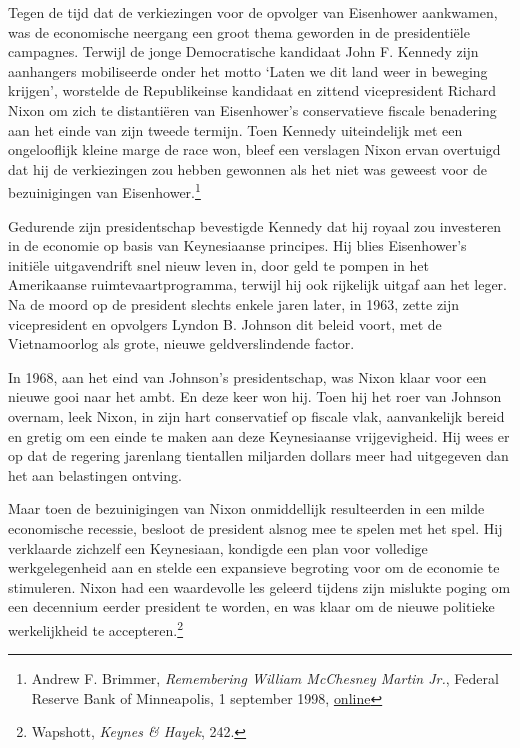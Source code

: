 \documentclass[
  a5paper,
  smalldemyvopaper,11pt,twoside,onecolumn,openright,extrafontsizes,
hidelinks]{memoir}
\begin{document}
Tegen de tijd dat de verkiezingen voor de opvolger van Eisenhower
aankwamen, was de economische neergang een groot thema geworden in de
presidentiële campagnes. Terwijl de jonge Democratische kandidaat John
F. Kennedy zijn aanhangers mobiliseerde onder het motto `Laten we dit
land weer in beweging krijgen', worstelde de Republikeinse kandidaat en
zittend vicepresident Richard Nixon om zich te distantiëren van
Eisenhower's conservatieve fiscale benadering aan het einde van zijn
tweede termijn. Toen Kennedy uiteindelijk met een ongelooflijk kleine
marge de race won, bleef een verslagen Nixon ervan overtuigd dat hij de
verkiezingen zou hebben gewonnen als het niet was geweest voor de
bezuinigingen van Eisenhower.\footnote{\hspace{0pt}Andrew F. Brimmer,
  \emph{Remembering William McChesney Martin Jr.}, Federal Reserve Bank
  of Minneapolis, 1 september 1998,
  \href{https://www.minneapolisfed.org/article/1998/remembering-william-mcchesney-martin-jr.}{online}}

Gedurende zijn presidentschap bevestigde Kennedy dat hij royaal zou
investeren in de economie op basis van Keynesiaanse principes. Hij blies
Eisenhower's initiële uitgavendrift snel nieuw leven in, door geld te
pompen in het Amerikaanse ruimtevaartprogramma, terwijl hij ook
rijkelijk uitgaf aan het leger. Na de moord op de president slechts
enkele jaren later, in 1963, zette zijn vicepresident en opvolgers
Lyndon B. Johnson dit beleid voort, met de Vietnamoorlog als grote,
nieuwe geldverslindende factor.

In 1968, aan het eind van Johnson's presidentschap, was Nixon klaar voor
een nieuwe gooi naar het ambt. En deze keer won hij. Toen hij het roer
van Johnson overnam, leek Nixon, in zijn hart conservatief op fiscale
vlak, aanvankelijk bereid en gretig om een einde te maken aan deze
Keynesiaanse vrijgevigheid. Hij wees er op dat de regering jarenlang
tientallen miljarden dollars meer had uitgegeven dan het aan belastingen
ontving.

Maar toen de bezuinigingen van Nixon onmiddellijk resulteerden in een
milde economische recessie, besloot de president alsnog mee te spelen
met het spel. Hij verklaarde zichzelf een Keynesiaan, kondigde een plan
voor volledige werkgelegenheid aan en stelde een expansieve begroting
voor om de economie te stimuleren. Nixon had een waardevolle les geleerd
tijdens zijn mislukte poging om een decennium eerder president te
worden, en was klaar om de nieuwe politieke werkelijkheid te
accepteren.\footnote{\hspace{0pt}Wapshott, \emph{Keynes \& Hayek}, 242.}
\end{document}

